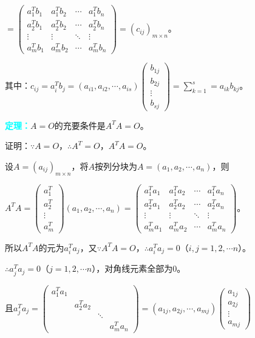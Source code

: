 \documentclass[UTF8, 12pt]{ctexart}
\begin{document}
$=\left(
    \begin{array}{cccc}
        a_1^Tb_1 & a_1^Tb_2 & \cdots & a_1^Tb_n \\
        a_2^Tb_1 & a_2^Tb_2 & \cdots & a_2^Tb_n \\
        \vdots & \vdots & \ddots & \vdots \\
        a_{m}^Tb_1 & a_{m}^Tb_2 & \cdots & a_{m}^Tb_n
    \end{array}
\right)=(c_{ij})_{m\times n}\text{。}$

其中：$c_{ij}=a_i^Tb_j=(a_{i1},a_{i2},\cdots,a_{is})\left(\begin{array}{c}
    b_{1j} \\
    b_{2j} \\
    \vdots \\
    b_{sj}
\end{array}\right)=\sum\limits_{k=1}^s=a_{ik}b_{kj}\text{。}$

\textcolor{aqua}{\textbf{定理：}}$A=O$的充要条件是$A^TA=O$。

证明：$\because A=O$，$\therefore A^T=O$，$A^TA=O$。

设$A=(a_{ij})_{m\times n}$，将$A$按列分块为$A=(a_1,a_2,\cdots,a_n)$，则 \medskip

$A^TA=\left(
    \begin{array}{c}
        a_1^T \\
        a_2^T \\
        \vdots \\
        a_{m}^T
    \end{array}
\right)(a_1,a_2,\cdots,a_n)=\left(
    \begin{array}{cccc}
        a_1^Ta_1 & a_1^Ta_2 & \cdots & a_1^Ta_n \\
        a_2^Ta_1 & a_2^Ta_2 & \cdots & a_2^Ta_n \\
        \vdots & \vdots & \ddots & \vdots \\
        a_{m}^Ta_1 & a_{m}^Ta_2 & \cdots & a_{m}^Ta_n
    \end{array}
\right)\text{。}$\medskip

所以$A^TA$的元为$a^T_ia_j$，又$\because A^TA=O$，$\therefore a^T_ia_j=0$（$i,j=1,2,\cdots n$）。

$\therefore a^T_ja_j=0$（$j=1,2,\cdots n$），对角线元素全部为0。\medskip

且$a^T_ja_j=\left(
    \begin{array}{cccc}
        a_1^Ta_1 & & & \\
         & a_2^Ta_2 & & \\
         & & \ddots & \\
         & & & a_{m}^Ta_n
    \end{array}
\right)=(a_{1j},a_{2j},\cdots,a_{mj})\left(\begin{array}{c}
    a_{1j} \\
    a_{2j} \\
    \vdots \\
    a_{mj}
\end{array}\right)$ \medskip
\end{document}
